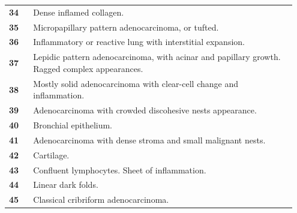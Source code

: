 \documentclass{l4proj}
\begin{document}
\begin{appendices}
\begin{longtable}{p{0.08\linewidth} p{0.87\linewidth}}
\textbf{34} & Dense inflamed collagen.                                                                             \\
\textbf{35} & Micropapillary pattern adenocarcinoma, or tufted.                                                    \\
\textbf{36} & Inflammatory or reactive lung with interstitial expansion.                                           \\
\textbf{37} & Lepidic pattern adenocarcinoma, with acinar and papillary growth. Ragged complex appearances.        \\
\textbf{38} & Mostly solid adenocarcinoma with clear-cell change and inflammation.                                 \\
\textbf{39} & Adenocarcinoma with crowded discohesive nests appearance.                                            \\
\textbf{40} & Bronchial epithelium.                                                                                \\
\textbf{41} & Adenocarcinoma with dense stroma and small malignant nests.                                          \\
\textbf{42} & Cartilage.                                                                                           \\
\textbf{43} & Confluent lymphocytes. Sheet of inflammation.                                                        \\
\textbf{44} & Linear dark folds.                                                                                   \\
\textbf{45} & Classical cribriform adenocarcinoma.                                                                
\end{longtable}




\end{appendices}
\end{document}
